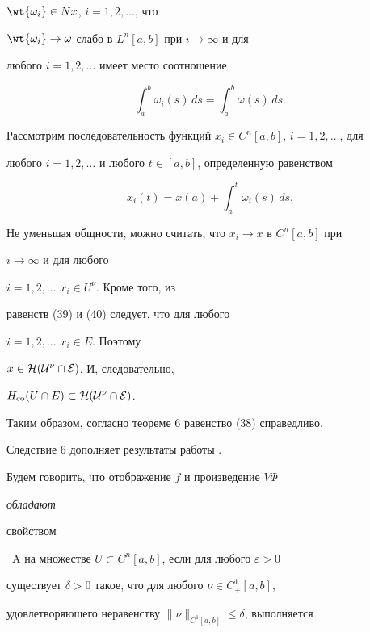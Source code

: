 $\wt{\omega_i}\in Nx$, $i=1,2,\dotsc$, что


$\wt{\omega_i}\to\omega$ слабо в $L^n[a,b]$ при $i\to\infty$ и для


любого $i=1,2,\dotsc$ имеет место соотношение


\begin{equation}


\int_a^b\omega_i(s)\,ds=\int_a^b\omega(s)\,ds.


\end{equation}


Рассмотрим последовательность функций $x_i\in C^n[a,b]$, $i=1,2,\dotsc$, для


любого $i=1,2,\dotsc$ и любого $t\in[a,b]$, определенную равенством


$$


x_i(t)=x(a)+\int_a^t\omega_i(s)\,ds.


$$


Не уменьшая общности, можно считать, что $x_i\to x$ в $C^n[a,b]$ при


$i\to\infty$ и для любого


$i=1,2,\dotsc$\; $x_i\in U^\nu$. Кроме того, из


равенств (39) и (40) следует, что для любого


$i=1,2,\dotsc$\; $x_i\in E$. Поэтому


$x\in\cal H(U^\nu \cap E)$. И, следовательно,


$H_{\operatorname{co}}(U\cap E)\subset\cal H(U^\nu\cap E)$.





Таким образом, согласно теореме 6 равенство (38) справедливо.





\begin{note} Следствие 6 дополняет результаты работы \cite{10}.


\end{note}





Будем говорить, что отображение $f$ и произведение $V\Phi$ {\it обладают


свойством}~A на множестве $U\subset C^n[a,b]$, если для любого $\varepsilon>0$


существует $\delta>0$ такое, что для любого $\nu\in C^1_+[a,b]$,


удовлетворяющего неравенству $\|\nu\|_{C^1[a,b]}\le\delta$, выполняется


